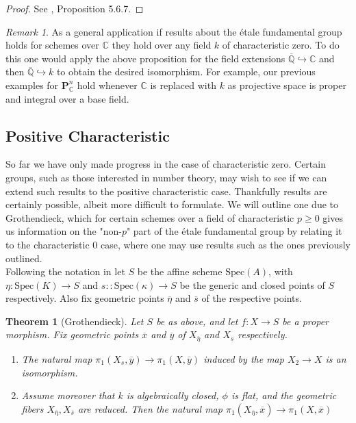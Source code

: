 \documentclass{article}
\newtheorem{theorem}{Theorem}[section]
\theoremstyle{definition}
\theoremstyle{remark}
\newtheorem*{remark}{Remark}
\newcommand{\C}{\mathbb{C}}
\newcommand{\Q}{\mathbb{Q}}
\begin{document}
\begin{proof}
	See \cite{Szamuely}, Proposition 5.6.7.
\end{proof}

\begin{remark}
	As a general application if results about the \'etale fundamental group holds for schemes over $\C$ they hold over any field  $k$ of characteristic zero.
	To do this one would apply the above proposition for the field extensions $\overline{\Q} \hookrightarrow \C$ and then $\overline{\Q} \hookrightarrow k$ to obtain the desired isomorphism.
	For example, our previous examples for $\textbf{P}_{\C}^n$ hold whenever $\C$ is replaced with $k$ as projective space is proper and integral over a base field.
\end{remark}

\subsection{Positive Characteristic}

So far we have only made progress in the case of characteristic zero.
Certain groups, such as those interested in number theory, may wish to see if we can extend such results
to the positive characteristic case.
Thankfully results are certainly possible, albeit more difficult to formulate.
We will outline one due to Grothendieck, which for certain schemes over a field of characteristic $p \geq 0$ gives us information on the "non-$p$" part of the \'etale fundamental group by relating it to the characteristic 0 case, where one may use results such as the ones previously outlined.\\

\indent Following the notation in \cite{Szamuely} let $S$ be the affine scheme $\text{Spec}(A)$, with $\eta \colon \text{Spec}(K) \to S$ and $s \colon: \text{Spec}(\kappa) \to S$ be the generic and closed points of $S$ respectively.
Also fix geometric points $\overline{\eta}$ and $\overline{s}$ of the respective points.

\begin{theorem}[Grothendieck]
	Let $S$ be as above, and let $f: X \to S$ be a proper morphism.
	Fix geometric points $\overline{x}$ and $\overline{y}$ of $X_{\overline{\eta}}$ and $X_s$ respectively.
	\begin{enumerate}
		\item The natural map $\pi_1(X_s, \overline{y}) \to \pi_1(X, \overline{y})$ induced by the map $X_2 \to X$ is an isomorphism.
		\item Assume moreover that $k$ is algebraically closed, $\phi$ is flat, and the geometric fibers $X_{\overline{\eta}}, X_{\overline{s}}$  are reduced.
			Then the natural map $\pi_1(X_{\overline{\eta}}, \overline{x}) \to \pi_1(X, \overline{x})$
	\end{enumerate}
	
\end{theorem}
\end{document}
